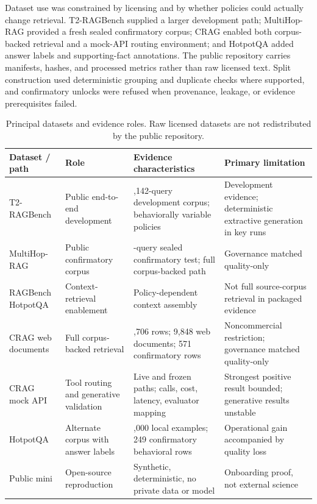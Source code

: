 \documentclass[11pt]{article}
\begin{document}
Dataset use was constrained by licensing and by whether policies could actually change retrieval. T2-RAGBench supplied a larger development path; MultiHop-RAG provided a fresh sealed confirmatory corpus; CRAG enabled both corpus-backed retrieval and a mock-API routing environment; and HotpotQA added answer labels and supporting-fact annotations. The public repository carries manifests, hashes, and processed metrics rather than raw licensed text. Split construction used deterministic grouping and duplicate checks where supported, and confirmatory unlocks were refused when provenance, leakage, or evidence prerequisites failed.

\begin{table}[t]
\centering
\caption{Principal datasets and evidence roles. Raw licensed datasets are not redistributed by the public repository.}
\small
\begin{tabularx}{\linewidth}{>{\raggedright\arraybackslash}X>{\raggedright\arraybackslash}X>{\raggedright\arraybackslash}X>{\raggedright\arraybackslash}X}
\toprule
\textbf{Dataset / path} & \textbf{Role} & \textbf{Evidence characteristics} & \textbf{Primary limitation} \\
\midrule
T2-RAGBench & Public end-to-end development & 1,142-query development corpus; behaviorally variable policies & Development evidence; deterministic extractive generation in key runs \\
MultiHop-RAG & Public confirmatory corpus & 331-query sealed confirmatory test; full corpus-backed path & Governance matched quality-only \\
RAGBench HotpotQA & Context-retrieval enablement & Policy-dependent context assembly & Not full source-corpus retrieval in packaged evidence \\
CRAG web documents & Full corpus-backed retrieval & 2,706 rows; 9,848 web documents; 571 confirmatory rows & Noncommercial restriction; governance matched quality-only \\
CRAG mock API & Tool routing and generative validation & Live and frozen paths; calls, cost, latency, evaluator mapping & Strongest positive result bounded; generative results unstable \\
HotpotQA & Alternate corpus with answer labels & 1,000 local examples; 249 confirmatory behavioral rows & Operational gain accompanied by quality loss \\
Public mini & Open-source reproduction & Synthetic, deterministic, no private data or model & Onboarding proof, not external science \\
\bottomrule
\end{tabularx}
\end{table}
\end{document}
